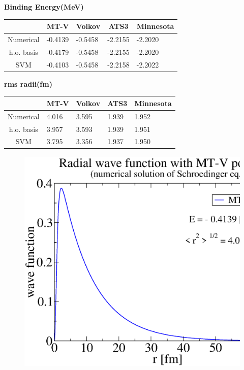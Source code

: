\documentclass[12pt,a4paper,titlepage]{jarticle}
\begin{document}
\title{}
\author{A4SB2121 Yusa Shusaku}
\date{}

\begin{center}{\bf\Large{Binding Energy(MeV)}}
\end{center}
\begin{center}
\begin{tabularx}{17cm}{|c|X|X|X|X|}
\hline
&\multicolumn{1}{|c|}{MT-V}&\multicolumn{1}{|c|}{Volkov}
&\multicolumn{1}{|c|}{ATS3}&\multicolumn{1}{|c|}{Minnesota}\\
\hline
Numerical&   -0.4139&-0.5458&-2.2155&-2.2020\\
\hline
h.o. basis&-0.4179&-0.5458&-2.2155&-2.2020\\
\hline
SVM&-0.4103&-0.5458&-2.2158&-2.2022\\
\hline
\end{tabularx}
\end{center}




\begin{center}{\bf\Large{rms radii(fm)}}
\end{center}
\begin{center}
\begin{tabularx}{17cm}{|c|X|X|X|X|}
\hline
&\multicolumn{1}{|c|}{MT-V}&\multicolumn{1}{|c|}{Volkov}
&\multicolumn{1}{|c|}{ATS3}&\multicolumn{1}{|c|}{Minnesota}\\
\hline
Numerical&4.016&3.595&1.939&1.952\\
\hline
h.o. basis&3.957&3.593&1.939&1.951\\
\hline
SVM&3.795&3.356&1.937&1.950\\
\hline
\end{tabularx}
\end{center}
\newpage

\begin{figure}[H]
\begin{center}
\includegraphics[width=140mm,height=110mm]{wf_numeric1.eps}
\end{center}
\end{figure}
\end{document}
